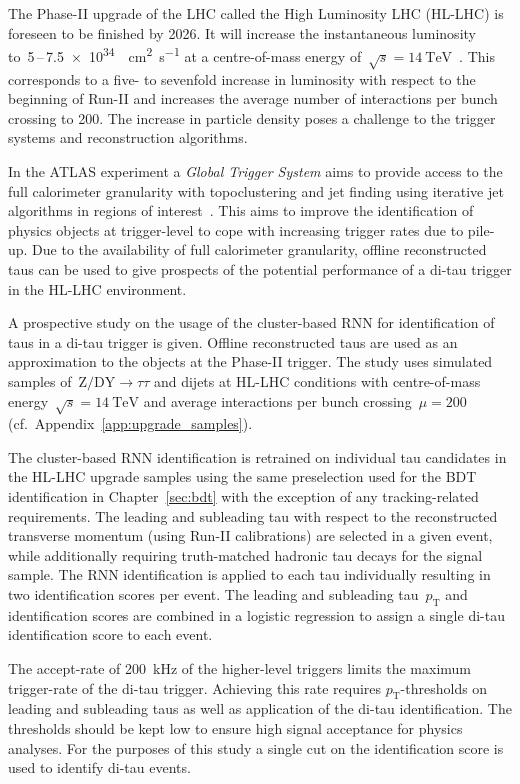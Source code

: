 The Phase-II upgrade of the LHC called the High Luminosity LHC (HL-LHC) is
foreseen to be finished by 2026. It will increase the instantaneous luminosity
to~\num{5}\,--\,\SI{7.5e34}{\per\square\centi\metre\per\second} at a
centre-of-mass energy
of~$\sqrt{s} = \SI{14}{\TeV}$~\cite{hl_lhc_prelim_design_report}. This
corresponds to a five- to sevenfold increase in luminosity with respect to the
beginning of Run-II and increases the average number of interactions per bunch
crossing to \num{200}. The increase in particle density poses a challenge to the
trigger systems and reconstruction algorithms.

In the ATLAS experiment a \emph{Global Trigger System} aims to provide access to
the full calorimeter granularity with topoclustering and jet finding using
iterative jet algorithms in regions of interest~\cite{phase_2_scoping}. This
aims to improve the identification of physics objects at trigger-level to cope
with increasing trigger rates due to pile-up. Due to the availability of full
calorimeter granularity, offline reconstructed taus can be used to give
prospects of the potential performance of a di-tau trigger in the HL-LHC
environment.

A prospective study on the usage of the cluster-based RNN for identification of
taus in a di-tau trigger is given. Offline reconstructed taus are used as an
approximation to the objects at the Phase-II trigger. The study uses simulated
samples of~$\text{Z} / \text{DY} \to \tau \tau$ and dijets at HL-LHC conditions
with centre-of-mass energy~$\sqrt{s}=\SI{14}{\TeV}$ and average interactions per
bunch crossing~$\mu = 200$ (cf.\ Appendix~\ref{app:upgrade_samples}).

The cluster-based RNN identification is retrained on individual tau candidates
in the HL-LHC upgrade samples using the same preselection used for the BDT
identification in Chapter~\ref{sec:bdt} with the exception of any
tracking-related requirements. The leading and subleading tau with respect to
the reconstructed transverse momentum (using Run-II calibrations) are selected
in a given event, while additionally requiring truth-matched hadronic tau decays
for the signal sample. The RNN identification is applied to each tau
individually resulting in two identification scores per event. The leading and
subleading tau~$p_\text{T}$ and identification scores are combined in a logistic
regression to assign a single di-tau identification score to each event.

The accept-rate of \SI{200}{\kilo\hertz} of the higher-level triggers limits the
maximum trigger-rate of the di-tau trigger. Achieving this rate requires
$p_\text{T}$-thresholds on leading and subleading taus as well as application of
the di-tau identification. The thresholds should be kept low to ensure high
signal acceptance for physics analyses. For the purposes of this study a single
cut on the identification score is used to identify di-tau events.


